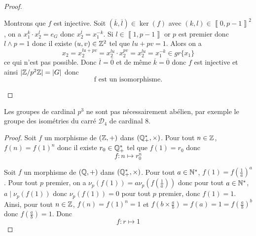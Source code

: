 \begin{proof}
\begin{enumerate}
		Montrons que $f$ est injective. Soit $(\overline{k},\overline{l})\in\ker(f)$ avec $(k,l)\in\left\llbracket 0,p-1\right\rrbracket^{2}$, on a $x_{1}^{k}\cdot x_{2}^{l}=e_{G}$ donc $x_{2}^{l}=x_{1}^{-k}$. Si $l\in\left\llbracket 1,p-1\right\rrbracket$ or $p$ est premier donc $l\wedge p=1$ donc il existe $(u,v)\in\mathbb{Z}^{2}$ tel que $lu+pv=1$. Alors on a 
		\begin{equation}
			x_{2}=x_{2}^{lu+pv}=x_{2}^{lu}\cdot x_{2}^{pv}=x_{2}^{lu}=x_{1}^{-k}\in gr\{x_{1}\}
		\end{equation} ce qui n'est pas possible. Donc $\overline{l}=\overline{0}$ et de même $\overline{k}=\overline{0}$ donc $f$ est injective et ainsi 
		$\vert\mathbb{Z}/p^{2}\mathbb{Z}\vert=\vert G\vert$ donc 
		\begin{equation}
			\boxed{\text{f est un isomorphisme.}}
		\end{equation}
	\end{enumerate}
\end{proof}

\begin{remark}
	Les groupes de cardinal $p^{3}$ ne sont pas nécessairement abélien, par exemple le groupe des isométries du carré $\mathcal{D}_{4}$ de cardinal 8.
\end{remark}

\begin{proof}
	Soit $f$ un morphisme de $(\mathbb{Z},+)$ dans $(\mathbb{Q}_{+}^{*},\times)$. Pour tout $n\in\mathbb{Z}$, $f(n)=f(1)^{n}$ donc il existe $r_{0}\in\mathbb{Q}_{+}^{*}$ tel que $f(1)=r_{0}$ donc 
	\begin{equation}
		\boxed{f\colon n\mapsto r_{0}^{n}}
	\end{equation}

	Soit $f$ un morphisme de $(\mathbb{Q},+)$ dans $(\mathbb{Q}_{+}^{*},\times)$. Pour tout $a\in\mathbb{N}^{*}$, $f(1)=f(\frac{1}{a})^{a}$. Pour tout $p$ premier, on a $\nu_{p}(f(1))=a\nu_{p}(f(\frac{1}{a}))$ donc pour tout $a\in\mathbb{N}^{*}$, $a\mid\nu_{p}(f(1))$ donc $\nu_{p}(f(1))=0$ pour tout $p$ premier, donc $f(1)=1$. Ainsi, pour tout $n\in\mathbb{Z}$, $f(n)=f(1)^{n}=1$ et $f(b\times\frac{a}{b})=f(a)=1=f(\frac{a}{b})^{b}$ donc $f(\frac{a}{b})=1$. Donc 
	\begin{equation}
		\boxed{f\colon r\mapsto 1}
	\end{equation}
\end{proof}

